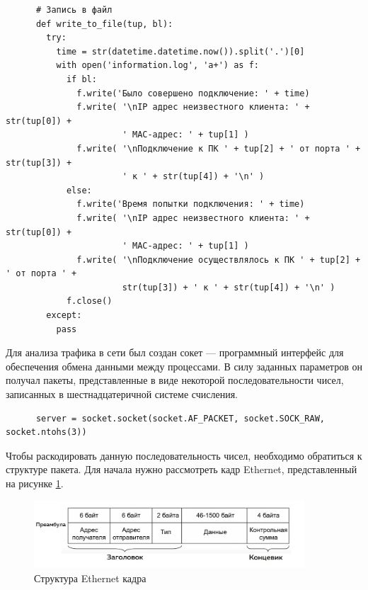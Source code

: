\documentclass[bachelor, och, coursework]{SCWorks}
\begin{document}
    \begin{verbatim}
      # Запись в файл
      def write_to_file(tup, bl):
        try:
          time = str(datetime.datetime.now()).split('.')[0]
          with open('information.log', 'a+') as f:
            if bl:
              f.write('Было совершено подключение: ' + time)
              f.write( '\nIP адрес неизвестного клиента: ' + str(tup[0]) + 
                       ' MAC-адрес: ' + tup[1] )
              f.write( '\nПодключение к ПК ' + tup[2] + ' от порта ' + str(tup[3]) + 
                       ' к ' + str(tup[4]) + '\n' )
            else:
              f.write('Время попытки подключения: ' + time)
              f.write( '\nIP адрес неизвестного клиента: ' + str(tup[0]) + 
                       ' MAC-адрес: ' + tup[1] )
              f.write( '\nПодключение осуществлялось к ПК ' + tup[2] + ' от порта ' + 
                       str(tup[3]) + ' к ' + str(tup[4]) + '\n' )
            f.close()
        except:
          pass
    \end{verbatim}

    Для анализа трафика в сети был создан сокет --- программный интерфейс для обеспечения обмена данными между процессами. В силу заданных параметров он
    получал пакеты, представленные в виде некоторой последовательности чисел, записанных в шестнадцатеричной системе счисления.
    
    \begin{verbatim}
      server = socket.socket(socket.AF_PACKET, socket.SOCK_RAW, socket.ntohs(3))
    \end{verbatim}
    
    Чтобы раскодировать данную последовательность чисел, необходимо обратиться к структуре пакета. Для начала нужно рассмотреть кадр Ethernet, представленный
    на рисунке \ref{eth-frame}.
    
    \begin{figure}[H]
      \centering
      \includegraphics[width=0.9\textwidth]{photo/eth-frame.jpg}
      \caption{Структура Ethernet кадра}
      \label{eth-frame}
    \end{figure}
    
\end{document}
